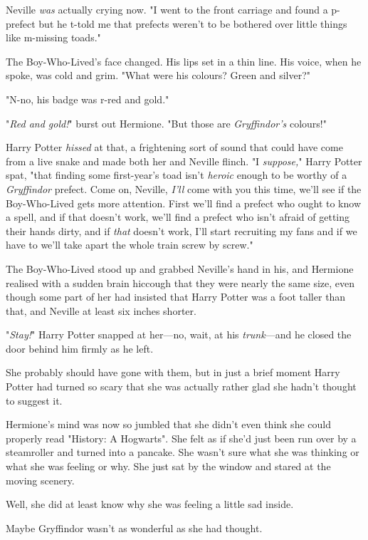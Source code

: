 Neville \emph{was} actually crying now. "I went to the front carriage and found 
a p-prefect but he t-told me that prefects weren't to be bothered over little 
things like m-missing toads."

The Boy-Who-Lived's face changed. His lips set in a thin line. His voice, when 
he spoke, was cold and grim. "What were his colours? Green and silver?"

"N-no, his badge was r-red and gold."

"\emph{Red and gold!}" burst out Hermione. "But those are \emph{Gryffindor's} 
colours!"

Harry Potter \emph{hissed} at that, a frightening sort of sound that could have 
come from a live snake and made both her and Neville flinch. "I 
\emph{suppose,}" Harry Potter spat, "that finding some first-year's toad isn't 
\emph{heroic} enough to be worthy of a \emph{Gryffindor} prefect. Come on, 
Neville, \emph{I'll} come with you this time, we'll see if the Boy-Who-Lived 
gets more attention. First we'll find a prefect who ought to know a spell, and 
if that doesn't work, we'll find a prefect who isn't afraid of getting their 
hands dirty, and if \emph{that} doesn't work, I'll start recruiting my fans and 
if we have to we'll take apart the whole train screw by screw."

The Boy-Who-Lived stood up and grabbed Neville's hand in his, and Hermione 
realised with a sudden brain hiccough that they were nearly the same size, even 
though some part of her had insisted that Harry Potter was a foot taller than 
that, and Neville at least six inches shorter.

"\emph{Stay!}" Harry Potter snapped at her---no, wait, at his 
\emph{trunk}---and he closed the door behind him firmly as he left.

She probably should have gone with them, but in just a brief moment Harry 
Potter had turned so scary that she was actually rather glad she hadn't thought 
to suggest it.

Hermione's mind was now so jumbled that she didn't even think she could 
properly read "History: A Hogwarts". She felt as if she'd just been run over by 
a steamroller and turned into a pancake. She wasn't sure what she was thinking 
or what she was feeling or why. She just sat by the window and stared at the 
moving scenery.

Well, she did at least know why she was feeling a little sad inside.

Maybe Gryffindor wasn't as wonderful as she had thought.